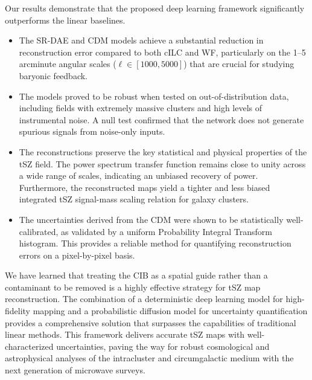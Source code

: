 \documentclass[]{article}
\begin{document}
Our results demonstrate that the proposed deep learning framework significantly outperforms the linear baselines.
\begin{itemize}
    \item The SR-DAE and CDM models achieve a substantial reduction in reconstruction error compared to both cILC and WF, particularly on the 1--5 arcminute angular scales ($\ell \in [1000, 5000]$) that are crucial for studying baryonic feedback.
    \item The models proved to be robust when tested on out-of-distribution data, including fields with extremely massive clusters and high levels of instrumental noise. A null test confirmed that the network does not generate spurious signals from noise-only inputs.
    \item The reconstructions preserve the key statistical and physical properties of the tSZ field. The power spectrum transfer function remains close to unity across a wide range of scales, indicating an unbiased recovery of power. Furthermore, the reconstructed maps yield a tighter and less biased integrated tSZ signal-mass scaling relation for galaxy clusters.
    \item The uncertainties derived from the CDM were shown to be statistically well-calibrated, as validated by a uniform Probability Integral Transform histogram. This provides a reliable method for quantifying reconstruction errors on a pixel-by-pixel basis.
\end{itemize}

We have learned that treating the CIB as a spatial guide rather than a contaminant to be removed is a highly effective strategy for tSZ map reconstruction. The combination of a deterministic deep learning model for high-fidelity mapping and a probabilistic diffusion model for uncertainty quantification provides a comprehensive solution that surpasses the capabilities of traditional linear methods. This framework delivers accurate tSZ maps with well-characterized uncertainties, paving the way for robust cosmological and astrophysical analyses of the intracluster and circumgalactic medium with the next generation of microwave surveys.


{}

\end{document}
